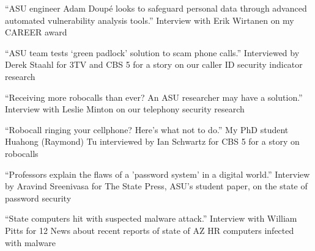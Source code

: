 \documentclass[11pt,letterpaper,sans]{moderncv}
\begin{document}






 {``ASU engineer Adam Doup\'e looks to
  safeguard personal data through advanced automated vulnerability
  analysis tools.'' Interview with Erik Wirtanen on my CAREER award} 

 {``ASU team tests `green padlock' solution to
  scam phone calls.'' Interviewed by Derek Staahl for 3TV and CBS 5
  for a story on our caller ID security indicator research}

 {``Receiving more robocalls than ever? An ASU
  researcher may have a solution.'' Interview with Leslie Minton on our
  telephony security research}

 {``Robocall ringing your cellphone? Here's
  what not to do.'' My PhD student Huahong (Raymond) Tu interviewed by
  Ian Schwartz for CBS 5 for a story on robocalls}

 {``Professors explain the flaws of a
  'password system' in a digital world.'' Interview by Aravind
  Sreenivasa for The State Press, ASU's student paper, on the state of
  password security}

 {``State computers hit with suspected
  malware attack.'' Interview with William Pitts for 12 News about
  recent reports of state of AZ HR computers infected with malware}
\end{document}
